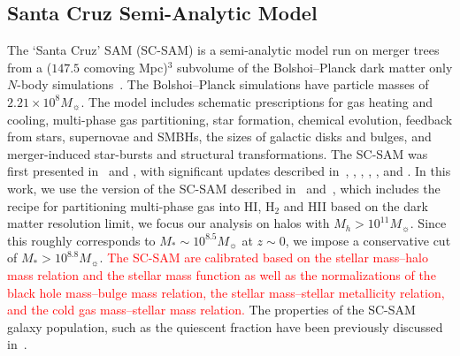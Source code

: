 \documentclass[tighten, preprint]{aastex62}
\begin{document}
\subsection{Santa Cruz Semi-Analytic Model} \label{sec:scsam}
The `Santa Cruz' SAM (SC-SAM) is a semi-analytic model run on 
merger trees from a ($147.5$ comoving Mpc)$^3$ subvolume of the 
Bolshoi--Planck dark matter only $N$-body simulations~\citep{rodriguez-puebla2016}. 
The Bolshoi--Planck simulations have particle masses of $2.21 \times 10^8 M_\sun$. 
The model includes schematic prescriptions for gas heating and 
cooling, multi-phase gas partitioning, star formation, chemical 
evolution, feedback from stars, supernovae and SMBHs, the sizes 
of galactic disks and 
bulges, and merger-induced star-bursts and structural transformations. 
The SC-SAM was first presented in~\cite{somerville1999} and 
\cite{somerville2001}, with significant updates described 
in~\cite{somerville2008}, \cite{somerville2008a}, \cite{somerville2012}, 
\cite{porter2014}, \cite{popping2014}, and \cite{somerville2015a}. In this 
work, we use the version of the SC-SAM described in~\cite{popping2014} 
and~\cite{somerville2015a}, which includes the \cite{gnedin2011} recipe 
for partitioning multi-phase gas into HI, H$_2$ and HII %
based on the dark matter resolution limit,
we focus our analysis on halos with $M_h{>}10^{11} M_\sun$.
Since this roughly corresponds to $M_*{\sim}10^{8.5} M_\sun$ at 
$z\sim 0$, we impose a conservative cut of $M_* > 10^{8.8}M_\sun$. 
\textcolor{red}{The SC-SAM are calibrated based on the stellar mass--halo mass 
relation and the stellar mass function as well as the normalizations of the 
black hole mass--bulge mass relation, the stellar mass--stellar metallicity 
relation, and the cold gas mass--stellar mass relation.
}
The properties of the SC-SAM galaxy population, 
such as the quiescent fraction have been previously discussed 
in~\cite{brennan2015,somerville2015a,somerville2015,brennan2017,pandya2017}.

\end{document}
